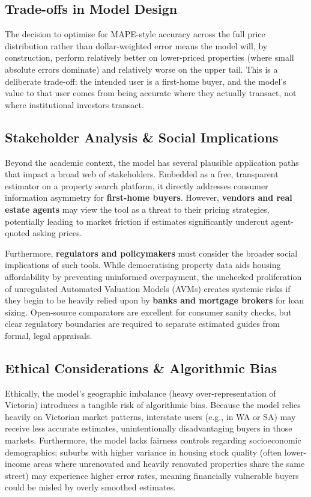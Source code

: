 \documentclass[a4paper,12pt]{article}
\begin{document}
\subsection{Trade-offs in Model Design}
The decision to optimise for MAPE-style accuracy across the full price distribution rather than dollar-weighted error means the model will, by construction, perform relatively better on lower-priced properties (where small absolute errors dominate) and relatively worse on the upper tail. This is a deliberate trade-off: the intended user is a first-home buyer, and the model's value to that user comes from being accurate where they actually transact, not where institutional investors transact.

\subsection{Stakeholder Analysis \& Social Implications}
Beyond the academic context, the model has several plausible application paths that impact a broad web of stakeholders. Embedded as a free, transparent estimator on a property search platform, it directly addresses consumer information asymmetry for \textbf{first-home buyers}. However, \textbf{vendors and real estate agents} may view the tool as a threat to their pricing strategies, potentially leading to market friction if estimates significantly undercut agent-quoted asking prices. 

Furthermore, \textbf{regulators and policymakers} must consider the broader social implications of such tools. While democratising property data aids housing affordability by preventing uninformed overpayment, the unchecked proliferation of unregulated Automated Valuation Models (AVMs) creates systemic risks if they begin to be heavily relied upon by \textbf{banks and mortgage brokers} for loan sizing. Open-source comparators are excellent for consumer sanity checks, but clear regulatory boundaries are required to separate estimated guides from formal, legal appraisals.


\subsection{Ethical Considerations \& Algorithmic Bias}
Ethically, the model's geographic imbalance (heavy over-representation of Victoria) introduces a tangible risk of algorithmic bias. Because the model relies heavily on Victorian market patterns, interstate users (e.g., in WA or SA) may receive  less accurate estimates, unintentionally disadvantaging buyers in those markets. Furthermore, the model lacks fairness controls regarding socioeconomic demographics; suburbs with higher variance in housing stock quality (often lower-income areas where unrenovated and heavily renovated properties share the same street) may experience higher error rates, meaning financially vulnerable buyers could be misled by overly smoothed estimates.
\end{document}
